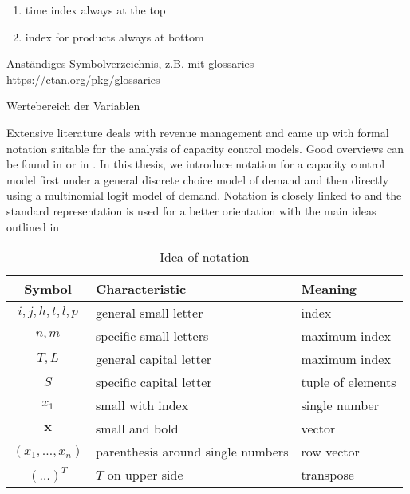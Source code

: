 \begin{boxStefan}
	\begin{enumerate}
		\item time index always at the top
		\item index for products always at bottom
	\end{enumerate}

	Anständiges Symbolverzeichnis, z.B. mit glossaries \url{https://ctan.org/pkg/glossaries}
	
	Wertebereich der Variablen
\end{boxStefan}


Extensive literature deals with revenue management and came up with formal notation suitable for the analysis of capacity control models. Good overviews can be found in \cite{Klein.2008} or in \cite{Phillips.2011}. In this thesis, we introduce notation for a capacity control model first under a general discrete choice model of demand and then directly using a multinomial logit model of demand. Notation is closely linked to \cite{Koch.2017} and the standard representation is used for a better orientation with the main ideas outlined in 

\begin{table}
	\caption{Idea of notation}\label{tb:Prob:Notation}
	\begin{tabular}{cll}
		\toprule
		Symbol & Characteristic & Meaning\\
		\midrule
		$i, j, h, t, l, p$ & general small letter & index\\
		$n, m$ & specific small letters & maximum index\\
		$T, L$ & general capital letter & maximum index\\
		$S$ & {\color{red}specific capital letter} & tuple of elements\\
		$x_1$ & small with index & single number\\
		$\boldsymbol{x}$ & small and bold & vector\\
		$(x_1, \dots, x_n)$ & parenthesis around single numbers & row vector\\
		$(\dots)^T$ & $T$ on upper side & transpose\\
		
	\end{tabular}
\end{table}

